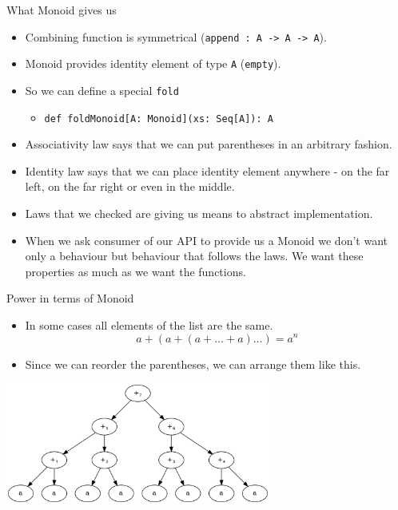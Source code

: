 \documentclass[presentation,aspectratio=169,smaller]{beamer}
\begin{document}
\begin{frame}[label={sec:org2b56e12},fragile]{What Monoid gives us}
 \begin{itemize}
\item Combining function is symmetrical (\texttt{append : A -> A -> A}).
\item Monoid provides identity element of type \texttt{A} (\texttt{empty}).
\item So we can define a special \texttt{fold}
\begin{itemize}
\item \texttt{def foldMonoid[A: Monoid](xs: Seq[A]): A}
\end{itemize}
\item Associativity law says that we can put parentheses in an arbitrary fashion.
\item Identity law says that we can place identity element anywhere - on the far
left, on the far right or even in the middle.
\item Laws that we checked are giving us means to abstract implementation.
\item When we ask consumer of our API to provide us a Monoid we don't want only a
behaviour but behaviour that follows the \alert{laws}. We want these \alert{properties} as
much as we want the functions.
\end{itemize}
\end{frame}

\begin{frame}[label={sec:orgbb3bfff}]{Power in terms of Monoid}
\begin{itemize}
\item In some cases all elements of the list are the same.
\pause
\begin{equation*}
  a + (a + (a + \ldots + a) \ldots ) = a ^ n
\end{equation*}
\end{itemize}

\pause

\begin{itemize}
\item Since we can reorder the parentheses, we can arrange them like this.
\end{itemize}

\pause
\begin{center}
\includegraphics[height=4cm]{.dot/fold-power-1.png}
\end{center}
\end{frame}
\end{document}
